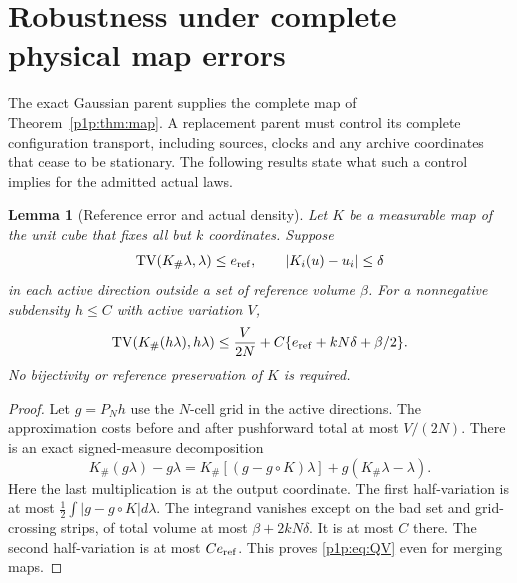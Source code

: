 \documentclass[11pt]{article}
\numberwithin{equation}{section}
\newtheorem{lemma}[theorem]{Lemma}
\theoremstyle{definition}
\theoremstyle{remark}
\begin{document}
\section{Robustness under complete physical map errors}
\label{p1p:sec:robustness}

The exact Gaussian parent supplies the complete map of
Theorem~\ref{p1p:thm:map}. A replacement parent must control its complete
configuration transport, including sources, clocks and any archive
coordinates that cease to be stationary. The following results state
what such a control implies for the admitted actual laws.

\begin{lemma}[Reference error and actual density]\label{p1p:lem:QV}
Let $K$ be a measurable map of the unit cube that fixes all but $k$
coordinates. Suppose
\[
 \operatorname{TV}(K_\#\lambda,\lambda)\leq e_{\rm ref},
 \qquad |K_i(u)-u_i|\leq\delta
\]
in each active direction outside a set of reference volume $\beta$.
For a nonnegative subdensity $h\leq C$ with active variation $V$,
\begin{equation}\label{p1p:eq:QV}
 \operatorname{TV}(K_\#(h\lambda),h\lambda)
 \leq\frac{V}{2N}+C\{e_{\rm ref}+kN\delta+\beta/2\}.
\end{equation}
No bijectivity or reference preservation of $K$ is required.
\end{lemma}
\begin{proof}
Let $g=P_Nh$ use the $N$-cell grid in the active directions.
The approximation costs before and after pushforward total at most
$V/(2N)$. There is an exact signed-measure decomposition
\begin{equation}\label{p1p:eq:decomposition}
 K_\#(g\lambda)-g\lambda
 =K_\#[(g-g\circ K)\lambda]+g(K_\#\lambda-\lambda).
\end{equation}
Here the last multiplication is at the output coordinate. The first
half-variation is at most $\frac12\int|g-g\circ K|d\lambda$.
The integrand vanishes except on the bad set and grid-crossing strips,
of total volume at most $\beta+2kN\delta$. It is at most $C$ there.
The second half-variation is at most $Ce_{\rm ref}$. This proves
\eqref{p1p:eq:QV} even for merging maps.
\end{proof}
\end{document}

